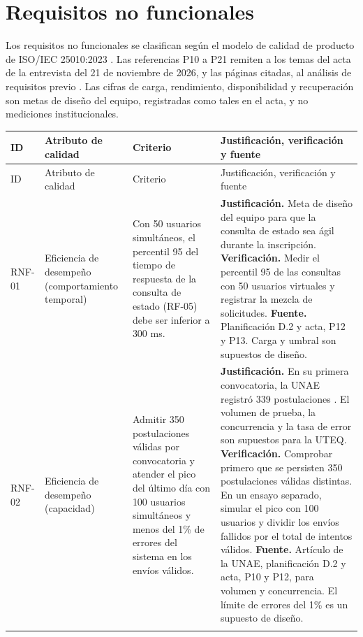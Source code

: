 \section{Requisitos no funcionales}
\label{sec:requisitos-no-funcionales}

Los requisitos no funcionales se clasifican según el modelo de calidad de producto de ISO/IEC 25010:2023 \cite{iso2023quality}.
Las referencias P10 a P21 remiten a los temas del acta de la entrevista del 21 de noviembre de 2026, y las páginas citadas, al análisis de requisitos previo \cite{sgacAntecedente}.
Las cifras de carga, rendimiento, disponibilidad y recuperación son metas de diseño del equipo, registradas como tales en el acta, y no mediciones institucionales.

\begingroup
\small
\begin{longtable}{@{}>{\raggedright\arraybackslash}p{.13\linewidth}>{\raggedright\arraybackslash}p{.17\linewidth}>{\raggedright\arraybackslash}p{.25\linewidth}>{\raggedright\arraybackslash}p{.32\linewidth}@{}}
\toprule
ID & Atributo de calidad & Criterio & Justificación, verificación y fuente \\
\midrule
\endfirsthead
\toprule
ID & Atributo de calidad & Criterio & Justificación, verificación y fuente \\
\midrule
\endhead
\midrule
\endfoot
\bottomrule
\endlastfoot
RNF-01 & Eficiencia de desempeño (comportamiento temporal) & Con 50 usuarios simultáneos, el percentil 95 del tiempo de respuesta de la consulta de estado (RF-05) debe ser inferior a 300 ms. & \textbf{Justificación.} Meta de diseño del equipo para que la consulta de estado sea ágil durante la inscripción. \textbf{Verificación.} Medir el percentil 95 de las consultas con 50 usuarios virtuales y registrar la mezcla de solicitudes. \textbf{Fuente.} Planificación D.2 y acta, P12 y P13. Carga y umbral son supuestos de diseño. \\ \addlinespace
RNF-02 & Eficiencia de desempeño (capacidad) & Admitir 350 postulaciones válidas por convocatoria y atender el pico del último día con 100 usuarios simultáneos y menos del 1\% de errores del sistema en los envíos válidos. & \textbf{Justificación.} En su primera convocatoria, la UNAE registró 339 postulaciones \cite[p.~37]{uyaguari2022unae}. El volumen de prueba, la concurrencia y la tasa de error son supuestos para la UTEQ. \textbf{Verificación.} Comprobar primero que se persisten 350 postulaciones válidas distintas. En un ensayo separado, simular el pico con 100 usuarios y dividir los envíos fallidos por el total de intentos válidos. \textbf{Fuente.} Artículo de la UNAE, planificación D.2 y acta, P10 y P12, para volumen y concurrencia. El límite de errores del 1\% es un supuesto de diseño. \\ \addlinespace

\end{longtable}
